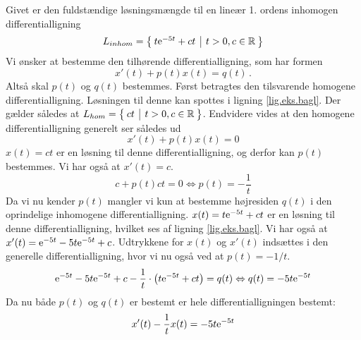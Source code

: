 \begin{example}
Givet er den fuldstændige løsningsmængde til en lineær 1. ordens inhomogen differentialligning
\begin{equation}
L_{inhom} = \left\lbrace \hspace*{-1mm} \begin{array}{c|c} t\mathrm{e}^{-5t} + ct & t>0, c \in \mathbb{R} \end{array} \hspace*{-1mm} \right\rbrace \label{lig.eks.bagl}
\end{equation}
Vi ønsker at bestemme den tilhørende differentialligning, som har formen
\begin{equation}
x'(t) + p(t)x(t) = q(t)\,.
\end{equation}
Altså skal $ p(t) $ og $ q(t) $ bestemmes. \bs
Først betragtes den tilsvarende homogene differentialligning. Løsningen til denne kan spottes i ligning \eqref{lig.eks.bagl}. Der gælder således at $ L_{hom} = \left\lbrace \hspace*{-1mm} \begin{array}{c|c} ct & t>0, c \in \mathbb{R} \end{array} \hspace*{-1mm} \right\rbrace $. Endvidere vides at den homogene differentialligning generelt ser således ud
\begin{equation}
x'(t) + p(t)x(t) = 0
\end{equation}
$ x(t) = ct $ er en løsning til denne differentialligning, og derfor kan $ p(t) $ bestemmes. Vi har også at $ x'(t) = c $.
\begin{equation}
c + p(t)ct = 0 \Leftrightarrow p(t) = -\frac{1}{t}
\end{equation}
Da vi nu kender $ p(t) $ mangler vi kun at bestemme højresiden $ q(t) $ i den oprindelige inhomogene differentialligning. $ x(t) = t\mathrm{e}^{-5t} + ct $ er en løsning til denne differentialligning, hvilket ses af ligning \eqref{lig.eks.bagl}. Vi har også at $ x'(t) = \mathrm{e}^{-5t} -5t\mathrm{e}^{-5t} + c $. Udtrykkene for $ x(t) $ og $ x'(t) $ indsættes i den generelle differentialligning, hvor vi nu også ved at $ p(t) = -1/t $.
\begin{equation}
\mathrm{e}^{-5t} -5t\mathrm{e}^{-5t} + c - \frac{1}{t} \cdot \left( t\mathrm{e}^{-5t} + ct \right) = q(t) \Leftrightarrow q(t) = -5t\mathrm{e}^{-5t}
\end{equation}
Da nu både $ p(t) $ og $ q(t) $ er bestemt er hele differentialligningen bestemt:
\begin{equation}
x'(t) -\frac{1}{t}x(t) = -5t\mathrm{e}^{-5t}
\end{equation}
\end{example}

